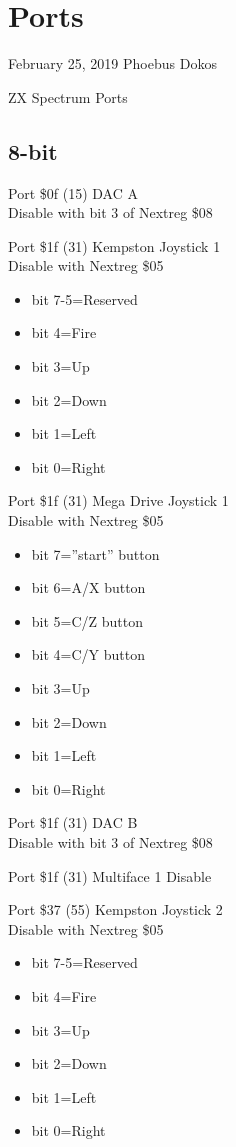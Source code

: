 \chapter{Ports}

February 25, 2019  Phoebus Dokos

\begin{table}[h]\centering\tiny
  \caption{ZX Spectrum Ports}
\end{table}

\section{8-bit}
Port \$0f (15) DAC A\\
Disable with bit 3 of Nextreg \$08

Port \$1f (31) Kempston Joystick 1\\
Disable with Nextreg \$05
\begin{itemize}
\item[] bit 7-5=Reserved
\item[] bit 4=Fire
\item[] bit 3=Up
\item[] bit 2=Down
\item[] bit 1=Left
\item[] bit 0=Right
\end{itemize}

Port \$1f (31) Mega Drive Joystick 1\\
Disable with Nextreg \$05
\begin{itemize}
\item[] bit 7=''start'' button
\item[] bit 6=A/X button
\item[] bit 5=C/Z button
\item[] bit 4=C/Y button
\item[] bit 3=Up
\item[] bit 2=Down
\item[] bit 1=Left
\item[] bit 0=Right
\end{itemize}

Port \$1f (31) DAC B\\
Disable with bit 3 of Nextreg \$08

Port \$1f (31) Multiface 1 Disable

Port \$37 (55) Kempston Joystick 2\\
Disable with Nextreg \$05
\begin{itemize}
\item[] bit 7-5=Reserved
\item[] bit 4=Fire
\item[] bit 3=Up
\item[] bit 2=Down
\item[] bit 1=Left
\item[] bit 0=Right
\end{itemize}

